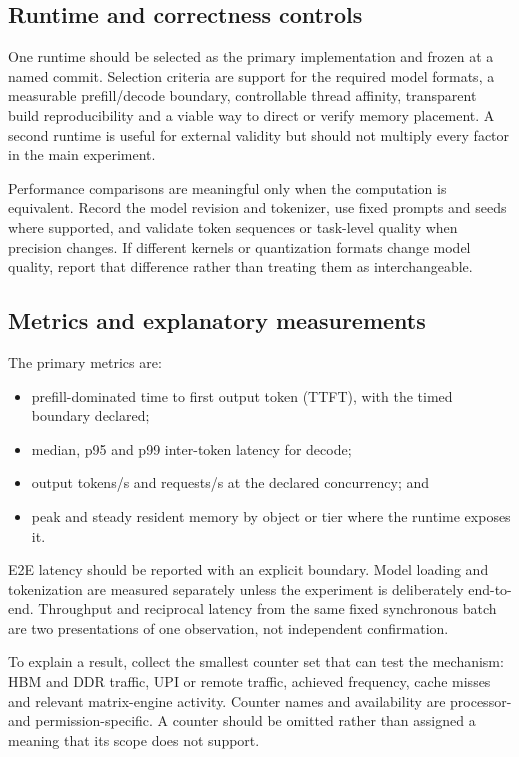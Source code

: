 \subsection{Runtime and correctness controls}

One runtime should be selected as the primary implementation and frozen
at a named commit.  Selection criteria are support for the required
model formats, a measurable prefill/decode boundary, controllable thread
affinity, transparent build reproducibility and a viable way to direct
or verify memory placement.  A second runtime is useful for external
validity but should not multiply every factor in the main experiment.

Performance comparisons are meaningful only when the computation is
equivalent.  Record the model revision and tokenizer, use fixed prompts
and seeds where supported, and validate token sequences or task-level
quality when precision changes.  If different kernels or quantization
formats change model quality, report that difference rather than
treating them as interchangeable.

\subsection{Metrics and explanatory measurements}

The primary metrics are:

\begin{itemize}
  \item prefill-dominated time to first output token (TTFT), with the
        timed boundary declared;
  \item median, p95 and p99 inter-token latency for decode;
  \item output tokens/s and requests/s at the declared concurrency; and
  \item peak and steady resident memory by object or tier where the
        runtime exposes it.
\end{itemize}

E2E latency should be reported with an explicit boundary.  Model loading
and tokenization are measured separately unless the experiment is
deliberately end-to-end.  Throughput and reciprocal latency from the
same fixed synchronous batch are two presentations of one observation,
not independent confirmation.

To explain a result, collect the smallest counter set that can test the
mechanism: HBM and DDR traffic, UPI or remote traffic, achieved
frequency, cache misses and relevant matrix-engine activity.  Counter
names and availability are processor- and permission-specific.  A
counter should be omitted rather than assigned a meaning that its scope
does not support.

